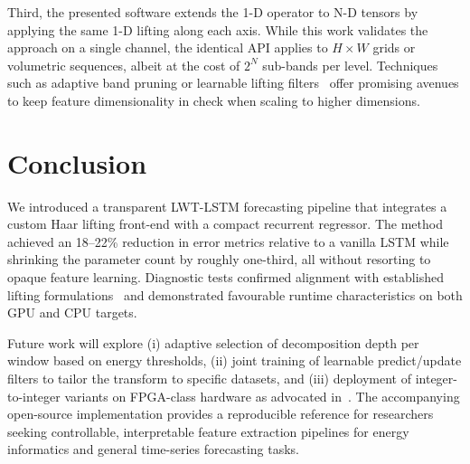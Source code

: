 \documentclass[journal]{IEEEtran}
\begin{document}
Third, the presented software extends the 1-D operator to N-D tensors by applying the same 1-D lifting along each axis. While this work validates the approach on a single channel, the identical API applies to $H\times W$ grids or volumetric sequences, albeit at the cost of $2^N$ sub-bands per level. Techniques such as adaptive band pruning or learnable lifting filters~\cite{mj2012pcadwtlwt} offer promising avenues to keep feature dimensionality in check when scaling to higher dimensions.

\section{Conclusion}

We introduced a transparent LWT-LSTM forecasting pipeline that integrates a custom Haar lifting front-end with a compact recurrent regressor. The method achieved an 18--22\% reduction in error metrics relative to a vanilla LSTM while shrinking the parameter count by roughly one-third, all without resorting to opaque feature learning. Diagnostic tests confirmed alignment with established lifting formulations~\cite{matlabLwtDoc,uytterhoeven1997lifting} and demonstrated favourable runtime characteristics on both GPU and CPU targets.

Future work will explore (i) adaptive selection of decomposition depth per window based on energy thresholds, (ii) joint training of learnable predict/update filters to tailor the transform to specific datasets, and (iii) deployment of integer-to-integer variants on FPGA-class hardware as advocated in~\cite{taha2020fpga}. The accompanying open-source implementation provides a reproducible reference for researchers seeking controllable, interpretable feature extraction pipelines for energy informatics and general time-series forecasting tasks.






%
\end{document}

